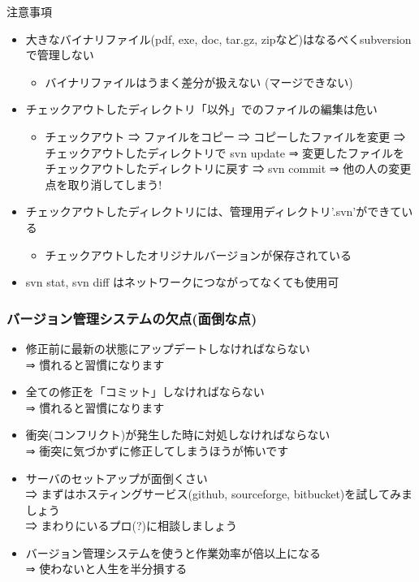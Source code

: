 \documentclass[dvipdfmx]{beamer}
\begin{document}
\begin{frame}[t,fragile]{注意事項}
  \begin{itemize}
  \item 大きなバイナリファイル(pdf, exe, doc, tar.gz, zipなど)はなるべくsubversionで管理しない
    \begin{itemize}
      \item バイナリファイルはうまく差分が扱えない (マージできない)
    \end{itemize}
  \item チェックアウトしたディレクトリ「以外」でのファイルの編集は危い
    \begin{itemize}
      \item チェックアウト ⇒ ファイルをコピー ⇒ コピーしたファイルを変更 ⇒ チェックアウトしたディレクトリで svn update ⇒ 変更したファイルをチェックアウトしたディレクトリに戻す ⇒ svn commit ⇒ {\color{red}他の人の変更点を取り消してしまう!}
    \end{itemize}
  \item チェックアウトしたディレクトリには、管理用ディレクトリ'.svn'ができている
    \begin{itemize}
      \item チェックアウトしたオリジナルバージョンが保存されている
    \end{itemize}
  \item svn stat, svn diff はネットワークにつながってなくても使用可
  \end{itemize}
\end{frame}

\begin{frame}
  \frametitle{バージョン管理システムの欠点(面倒な点)}
  \begin{itemize}
  \item 修正前に最新の状態にアップデートしなければならない \\
   ⇒ 慣れると習慣になります
  \item 全ての修正を「コミット」しなければならない \\
    ⇒ 慣れると習慣になります
  \item 衝突(コンフリクト)が発生した時に対処しなければならない \\
    ⇒ 衝突に気づかずに修正してしまうほうが怖いです
  \item サーバのセットアップが面倒くさい \\
    ⇒ まずはホスティングサービス(github, sourceforge, bitbucket)を試してみましょう \\
    ⇒ まわりにいるプロ(?)に相談しましょう \\[.5em]
  \item バージョン管理システムを使うと作業効率が倍以上になる \\
    ⇒ {\color{red} 使わないと人生を半分損する}
  \end{itemize}
\end{frame}
\end{document}
